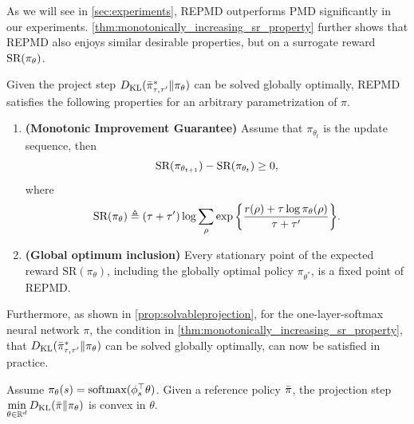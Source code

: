 As we will see in \cref{sec:experiments}, REPMD outperforms PMD significantly in our experiments. 
\cref{thm:monotonically_increasing_sr_property} further shows that REPMD also enjoys similar desirable properties, but on a surrogate reward $\text{SR}(\pi_\theta) $.
\begin{thm}
\label{thm:monotonically_increasing_sr_property}
Given the project step $D_{\mathrm{KL}}( \bar{\pi}_{\tau,\tau^{\prime}}^* \| \pi_\theta )$ can be solved globally optimally, REPMD satisfies the following properties for an arbitrary parametrization of $\pi$.
\begin{enumerate}
	\item {\bf (Monotonic Improvement Guarantee)} 
	Assume that $\pi_{\theta_{t}}$ is the update sequence, then 
	\begin{equation*}
	\text{SR}(\pi_{\theta_{t+1}}) - \text{SR}(\pi_{\theta_t})\ge 0,
	\end{equation*}
	where
	\begin{equation}
	\label{eq:SR}
	\text{SR}(\pi_\theta) \triangleq (\tau + \tau^{\prime})\log{ \sum_{\rho}{ \exp\left\{ \frac{r(\rho) + \tau \log{\pi_\theta(\rho)} }{\tau + \tau^{\prime}} \right\} }}.
	\end{equation}
	\item {\bf (Global optimum inclusion)} Every stationary point of the expected reward $\text{SR}(\pi_\theta)$, including the globally optimal policy $\pi_{\theta^*}$,  is a fixed point of REPMD.  
\end{enumerate}
\end{thm}

Furthermore, as shown in \cref{prop:solvableprojection}, 
for the one-layer-softmax neural network $\pi$, the condition in \cref{thm:monotonically_increasing_sr_property}, that $D_{\mathrm{KL}}( \bar{\pi}_{\tau,\tau^{\prime}}^* \| \pi_\theta )$ can be solved globally optimally, can now be satisfied in practice.
\begin{prop}
	\label{prop:solvableprojection}
	Assume $\pi_\theta(s) = \mathrm{softmax}(\phi_s^{\top}\theta)$. Given a reference policy $\bar{\pi}$, the projection step $\min\limits_{\theta \in \mathbb{R}^d}{D_{\mathrm{KL}}(\bar{\pi} \| \pi_\theta)}$ is convex in $\theta$.
\end{prop}


